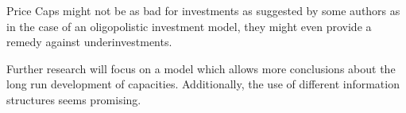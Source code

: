 Price Caps might not be as bad for investments as suggested by some authors as in the case of an oligopolistic investment model, they might even provide a remedy against underinvestments.

Further research will focus on a model which allows more conclusions about the long run development of capacities. Additionally, the use of different information structures seems promising.


 

